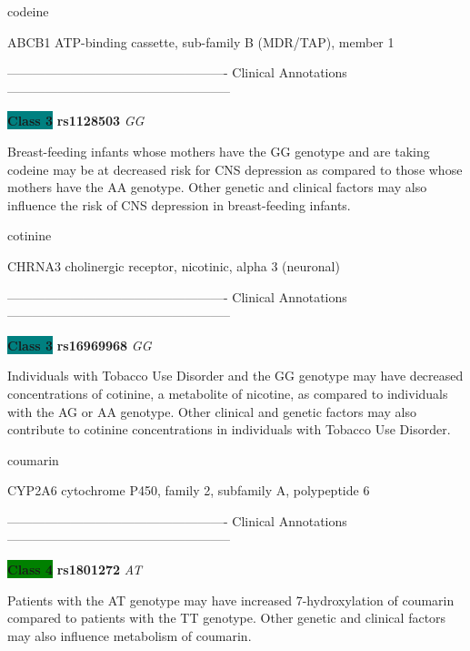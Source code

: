 \documentclass{resume} %
\begin{document}
\begin{rSection}{ codeine }
\begin{rSubsection}{ ABCB1 }{ ATP-binding cassette, sub-family B (MDR/TAP), member 1 }{}{}
\item[] ---------------------------------------------------- Clinical Annotations -----------------------------------------------------\newline
\item \textbf{\colorbox{teal} {Class 3}} \textbf{ rs1128503 } \textit{ GG }
\item[] Breast-feeding infants whose mothers have the GG genotype and are taking codeine may be at decreased risk for CNS depression as compared to those whose mothers have the AA genotype. Other genetic and clinical factors may also influence the risk of CNS depression in breast-feeding infants. 
\end{rSubsection}

\end{rSection}\begin{rSection}{ cotinine }
\item[]

\begin{rSubsection}{ CHRNA3 }{ cholinergic receptor, nicotinic, alpha 3 (neuronal) }{}{}
\item[]

\item[] ---------------------------------------------------- Clinical Annotations -----------------------------------------------------\newline
\item \textbf{\colorbox{teal} {Class 3}} \textbf{ rs16969968 } \textit{ GG }
\item[] Individuals with Tobacco Use Disorder and the GG genotype may have decreased concentrations of cotinine, a metabolite of nicotine, as compared to individuals with the AG or AA genotype. Other clinical and genetic factors may also contribute to cotinine concentrations in individuals with Tobacco Use Disorder.
\end{rSubsection}

\end{rSection}\begin{rSection}{ coumarin }
\item[]

\begin{rSubsection}{ CYP2A6 }{ cytochrome P450, family 2, subfamily A, polypeptide 6 }{}{}
\item[]

\item[] ---------------------------------------------------- Clinical Annotations -----------------------------------------------------\newline
\item \textbf{\colorbox{green} {Class 4}} \textbf{ rs1801272 } \textit{ AT }
\item[] Patients with the AT genotype may have increased 7-hydroxylation of coumarin compared to patients with the TT genotype. Other genetic and clinical factors may also influence metabolism of coumarin.
\end{rSubsection}


\end{rSection}
\end{document}
